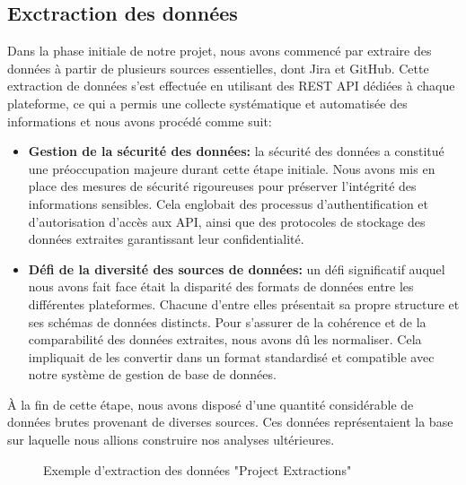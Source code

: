         \subsection{Exctraction des données }
    
        \par Dans la phase initiale de notre projet, nous avons commencé par extraire des données à partir de plusieurs sources essentielles, dont Jira et GitHub. Cette extraction de données s'est effectuée en utilisant des REST API dédiées à chaque plateforme, ce qui a permis une collecte systématique et automatisée des informations et nous avons procédé comme suit:
        \begin{itemize}
            \item \par\textbf{ Gestion de la sécurité des données:} la sécurité des données a constitué une préoccupation majeure durant cette étape initiale. Nous avons mis en place des mesures de sécurité rigoureuses pour préserver l'intégrité des informations sensibles. Cela englobait des processus d'authentification et d'autorisation d'accès aux API, ainsi que des protocoles de stockage des données extraites garantissant leur confidentialité.
             \item \par\textbf{Défi de la diversité des sources de données: }un défi significatif auquel nous avons fait face était la disparité des formats de données entre les différentes plateformes. Chacune d'entre elles présentait sa propre structure et ses schémas de données distincts. Pour s'assurer de la cohérence et de la comparabilité des données extraites, nous avons dû les normaliser. Cela impliquait de les convertir dans un format standardisé et compatible avec notre système de gestion de base de données.
        \end{itemize}
        \par À la fin de cette étape, nous avons disposé d'une quantité considérable de données brutes provenant de diverses sources. Ces données représentaient la base sur laquelle nous allions construire nos analyses ultérieures.


        \begin{figure}[H]
            \centering
            \caption{Exemple d'extraction des données "Project Extractions"}
            \label{fig:extract}

        \end{figure}

